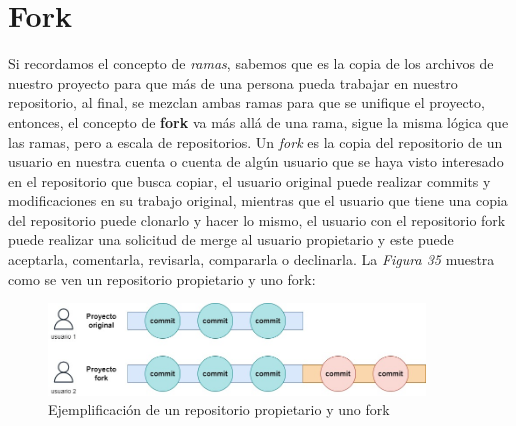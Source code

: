 \section{Fork}
\hspace{0.55cm}Si recordamos el concepto de \textit{ramas}, sabemos que es la copia de los archivos de nuestro proyecto para que más de una persona pueda trabajar en nuestro repositorio, al final, se mezclan ambas ramas para que se unifique el proyecto, entonces, el concepto de \textbf{fork} va más allá de una rama, sigue la misma lógica que las ramas, pero a escala de repositorios. Un \textit{fork} es la copia del repositorio de un usuario en nuestra cuenta o cuenta de algún usuario que se haya visto interesado en el repositorio que busca copiar, el usuario original puede realizar commits y modificaciones en su trabajo original, mientras que el usuario que tiene una copia del repositorio puede clonarlo y hacer lo mismo, el usuario con el repositorio fork puede realizar una solicitud de merge al usuario propietario y este puede aceptarla, comentarla, revisarla, compararla o declinarla. La \textit{Figura 35} muestra como se ven un repositorio propietario y uno fork:
\begin{figure}[H]
    \begin{center}
        \caption{Ejemplificación de un repositorio propietario y uno fork}
        \label{fig: 35}
        \includegraphics[width=10cm]{capturas/fork1.jpg}
    \end{center}
\end{figure}

